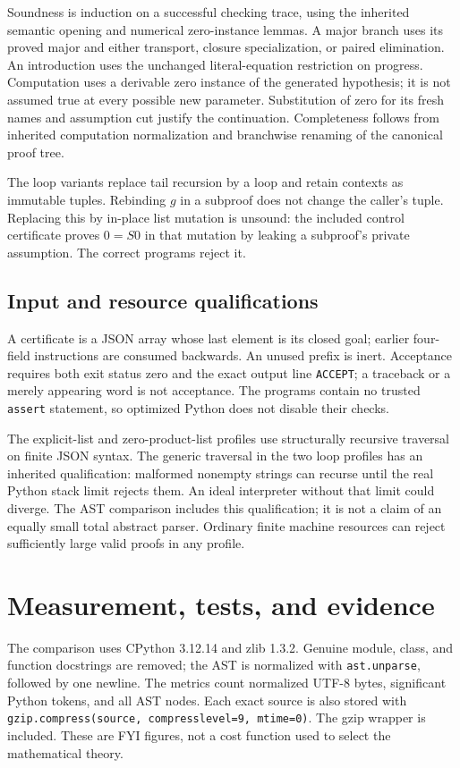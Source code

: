\documentclass[11pt,letterpaper]{article}
\theoremstyle{definition}\newtheorem{definition}[theorem]{Definition}
\theoremstyle{remark}\newtheorem{remark}[theorem]{Remark}
\begin{document}
Soundness is induction on a successful checking trace, using the
inherited semantic opening and numerical zero-instance lemmas. A major
branch uses its proved major and either transport, closure specialization,
or paired elimination. An introduction uses the unchanged literal-equation
restriction on progress. Computation uses a derivable zero instance of
the generated hypothesis; it is not assumed true at every possible new
parameter. Substitution of zero for its fresh names and assumption cut
justify the continuation. Completeness follows from inherited computation
normalization and branchwise renaming of the canonical proof tree.

The loop variants replace tail recursion by a loop and retain contexts
as immutable tuples. Rebinding $g$ in a subproof does not change the
caller's tuple. Replacing this by in-place list mutation is unsound:
the included control certificate proves $0=S0$ in that mutation by
leaking a subproof's private assumption. The correct programs reject it.

\subsection{Input and resource qualifications}
A certificate is a JSON array whose last element is its closed goal;
earlier four-field instructions are consumed backwards. An unused prefix
is inert. Acceptance requires both exit status zero and the exact output
line \texttt{ACCEPT}; a traceback or a merely appearing word is not acceptance.
The programs contain no trusted \texttt{assert} statement, so optimized
Python does not disable their checks.

The explicit-list and zero-product-list profiles use structurally
recursive traversal on finite JSON syntax. The generic traversal in
the two loop profiles has an inherited qualification: malformed
nonempty strings can recurse until the real Python stack limit rejects
them. An ideal interpreter without that limit could diverge. The AST
comparison includes this qualification; it is not a claim of an equally
small total abstract parser. Ordinary finite machine resources can
reject sufficiently large valid proofs in any profile.

\section{Measurement, tests, and evidence}
\label{sec:evidence}
The comparison uses CPython 3.12.14 and zlib 1.3.2. Genuine module,
class, and function docstrings are removed; the AST is normalized with
\texttt{ast.unparse}, followed by one newline. The metrics count
normalized UTF-8 bytes, significant Python tokens, and all AST nodes.
Each exact source is also stored with
\texttt{gzip.compress(source, compresslevel=9, mtime=0)}.
The gzip wrapper is included. These are FYI figures, not a cost function
used to select the mathematical theory.
\end{document}
